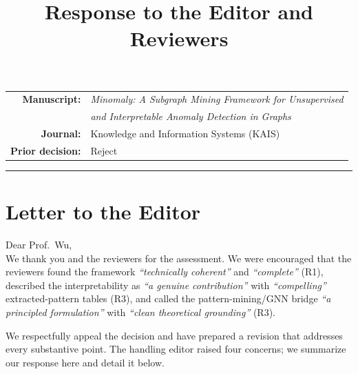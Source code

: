 \documentclass[11pt]{article}
\title{\vspace{-1.2cm}\color{accent}\Large\textbf{Response to the Editor and Reviewers}}
\author{}\date{}
\begin{document}
\maketitle
\vspace{-1.6cm}
\begin{center}
\begin{tabular}{rl}
\textbf{Manuscript:} & \emph{Minomaly: A Subgraph Mining Framework for Unsupervised}\\
 & \emph{and Interpretable Anomaly Detection in Graphs}\\[2pt]
\textbf{Journal:} & Knowledge and Information Systems (KAIS)\\
\textbf{Prior decision:} & Reject\\
\end{tabular}
\end{center}
\noindent\rule{\textwidth}{0.8pt}

\section{Letter to the Editor}
\noindent Dear Prof.\ Wu,\\[4pt]

We thank you and the reviewers for the assessment. We were encouraged that the reviewers found the framework \emph{``technically coherent''} and \emph{``complete''} (R1), described the interpretability as \emph{``a genuine contribution''} with \emph{``compelling''} extracted-pattern tables (R3), and called the pattern-mining/GNN bridge \emph{``a principled formulation''} with \emph{``clean theoretical grounding''} (R3).

We respectfully appeal the decision and have prepared a revision that addresses every substantive point. The handling editor raised four concerns; we summarize our response here and detail it below.
\end{document}
